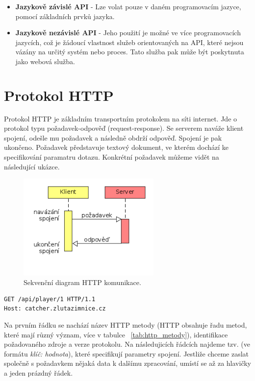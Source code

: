 \begin{itemize}
  \item \textbf{Jazykově závislé API} - Lze volat pouze v daném programovacím jazyce, pomocí základních prvků jazyka.
  \item \textbf{Jazykově nezávislé API} - Jeho použití je možné ve více programovacích jazycích, což je žádoucí vlastnost
    služeb orientovaných na API, které nejsou vázány na určitý systém nebo proces.
    Tato služba pak může být poskytnuta jako webová služba.
\end{itemize}

\section{Protokol HTTP}

\indent


Protokol HTTP je základním transportním protokolem na síti internet.
Jde o protokol typu požadavek-odpověď (request-response). Se serverem naváže klient spojení,
odešle mu požadavek a následně obdrží odpověď. Spojení je pak ukončeno.
Požadavek představuje textový dokument, ve kterém dochází ke specifikování paramatru dotazu.
Konkrétní požadavek můžeme vidět na následující ukázce.

\begin{figure}[ht!]
\centering
\includegraphics[width=70mm]{./images/http-komunikace.png}
\caption{Sekvenční diagram HTTP komunikace.\label{overflow}}
\end{figure}

\begingroup
\fontsize{9.5pt}{11pt}\selectfont
\begin{verbatim}
GET /api/player/1 HTTP/1.1
Host: catcher.zlutazimnice.cz
\end{verbatim}
\endgroup

Na prvním řádku se nachází název HTTP metody (HTTP obsahuje řadu metod, které mají různý význam, více v tabulce ~\ref{tab:http_metody}),
identifikace požadovaného zdroje a verze protokolu. Na následujicích řádcích najdeme tzv. 
(ve formátu \textit{klíč: hodnota}), které specifikují parametry spojení. Jestliže chceme zaslat společně s požadavkem
nějaká data k dalšímu zpracování, umístí se až za hlavičky a jeden prázdný řádek.

